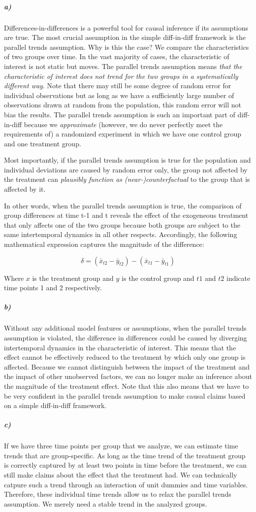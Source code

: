 \documentclass[12pt]{article}\usepackage[]{graphicx}\usepackage[]{color}
\begin{document}
\subparagraph{a)} Differences-in-differences is a powerful tool for causal inference if its assumptions are true. The most crucial assumption in the simple diff-in-diff framework is the parallel trends assumption. Why is this the case? We compare the characteristics of two groups over time. In the vast majority of cases, the characteristic of interest is not static but moves. The parallel trends assumption means \textit{that the characteristic of interest does not trend for the two groups in a systematically different way}. Note that there may still be some degree of random error for individual observations but as long as we have a sufficiently large number of observations drawn at random from the population, this random error will not bias the results. The parallel trends assumption is such an important part of diff-in-diff because we \textit{approximate} (however, we do never perfectly meet the requirements of) a randomized experiment in which we have one control group and one treatment group.

Most importantly, if the parallel trends assumption is true for the population and individual deviations are caused by random error only, the group not affected by the treatment can \textit{plausibly function as (near-)counterfactual} to the group that is affected by it.

In other words, when the parallel trends assumption is true, the comparison of group differences at time t-1 and t reveals the effect of the exogeneous treatment that only affects one of the two groups because both groups are subject to the same intertemporal dynamics in all other respects. Accordingly, the following mathematical expression captures the magnitude of the difference:

$$ \delta = (\bar{x} _{t2} - \bar{y} _{t2}) - (\bar{x} _{t1} - \bar{y} _{t1}) $$

Where $x$ is the treatment group and $y$ is the control group and $t1$ and $t2$ indicate time points 1 and 2 respectively.

\subparagraph{b)} Without any additional model features or assumptions, when the parallel trends assumption is violated, the difference in differences could be caused by diverging intertemporal dynamics in the characteristic of interest. This means that the effect cannot be effectively reduced to the treatment by which only one group is affected. Because we cannot distinguish between the impact of the treatment and the impact of other unobserved factors, we can no longer make an inference about the magnitude of the treatment effect. Note that this also means that we have to be very confident in the parallel trends assumption to make causal claims based on a simple diff-in-diff framework.

\subparagraph{c)} If we have three time points per group that we analyze, we can estimate time trends that are group-specific. As long as the time trend of the treatment group is correctly captured by at least two points in time before the treatment, we can still make claims about the effect that the treatment had. We can technically catpure such a trend through an interaction of unit dummies and time variables. Therefore, these individual time trends allow us to relax the parallel trends assumption. We merely need a stable trend in the analyzed groups.
\end{document}
